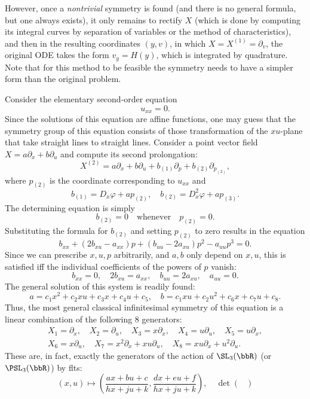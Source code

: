 \begin{example}
    However, once a \emph{nontrivial} symmetry is found (and there is no general formula, but one always exists), it only remains to rectify $X$ (which is done by computing its integral curves by separation of variables or the method of characteristics), and then in the resulting coordinates $(y,v)$, in which $X=X^{(1)}=\partial_v$, the original ODE takes the form $v_y=H(y)$, which is integrated by quadrature. Note that for this method to be feasible the symmetry needs to have a simpler form than the original problem.
\end{example}


\begin{example}
    Consider the elementary second-order equation 
    \[u_{xx}=0.\]
    Since the solutions of this equation are affine functions, one may guess that the symmetry group of this equation consists of those transformation of the $xu$-plane that take straight lines to straight lines. Consider a point vector field $X=a\partial_x+b\partial_u$ and compute its second prolongation:
    \[X^{(2)}=a\partial_x+b\partial_u+b_{(1)}\partial_p+b_{(2)}\partial_{p_{(2)}},\]
    where $p_{(2)}$ is the coordinate corresponding to $u_{xx}$ and 
    \[b_{(1)}=D_x \varphi+a p_{(2)},\quad b_{(2)}=D_x^2\varphi+a p_{(3)}.\]
    The determining equation is simply 
    \[b_{(2)}=0 \quad\text{whenever}\quad p_{(2)}=0.\]
    Substituting the formula for $b_{(2)}$ and setting $p_{(2)}$ to zero results in the equation 
    \[b_{xx}+(2b_{xu}-a_{xx})p+(b_{uu}-2a_{xu})p^2-a_{uu}p^3=0.\]
    Since we can prescribe $x,u,p$ arbitrarily, and $a,b$ only depend on $x,u$, this is satisfied iff the individual coefficients of the powers of $p$ vanish:
    \[b_{xx}=0,\quad 2b_{xu}=a_{xx},\quad b_{uu}=2a_{xu},\quad a_{uu}=0.\]
    The general solution of this system is readily found:
    \[a=c_1x^2+c_2xu+c_3x+c_4u+c_5,\quad b=c_1xu+c_2u^2+c_6x+c_7u+c_8.\]
    Thus, the most general classical infinitesimal symmetry of this equation is a linear combination of the following $8$ generators:
    \begin{gather}
        X_1=\partial_x,\quad X_2=\partial_u,\quad         X_3=x\partial_x,\quad X_4=u\partial_u,\quad X_5=u\partial_x,\\
        X_6=x\partial_u,\quad X_7=x^2\partial_x+xu\partial_u,\quad X_8=xu\partial_x+u^2\partial_u.
    \end{gather}
    These are, in fact, exactly the generators of the action of $\SL_3(\bbR)$ (or $\PSL_3(\bbR)$) by \glspl{flt}:
    \[(x,u)\mapsto \left(\frac{ax+bu+c}{hx+ju+k},\frac{dx+eu+f}{hx+ju+k}\right), \quad \det\begin{pmatrix}

\end{pmatrix}\]
\end{example}
